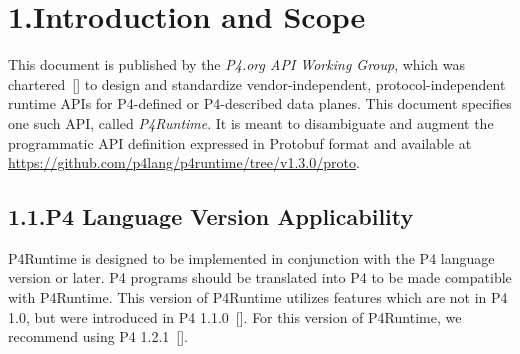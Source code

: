 \documentclass[11pt]{article}
\begin{document}
{\begin{mdtoc}
\begin{mdtocblock}

\end{mdtocblock}%
\end{mdtoc}%

\section{1.\hspace*{0.5em}Introduction and Scope}\label{sec-introduction-and-scope}%

\noindent{}This document is published by the \emph{P4.org API Working Group}, which was
chartered~[] to design and standardize vendor-independent,
protocol-independent runtime APIs for P4-defined or P4-described data
planes. This document specifies one such API, called \emph{P4Runtime}. It is meant to
disambiguate and augment the programmatic API definition expressed in Protobuf
format and available at
\href{https://github.com/p4lang/p4runtime/tree/v1.3.0/proto}{https://github.com/p4lang/p4runtime/tree/v1.3.0/proto}.%

\subsection{1.1.\hspace*{0.5em}P4 Language Version Applicability}\label{sec-p4-language-version-applicability}%

\noindent{}P4Runtime is designed to be implemented in conjunction with the P4 language
version or later. P4 programs should be translated into P4 to be made
compatible with P4Runtime. This version of P4Runtime utilizes features which are
not in P4 1.0, but were introduced in P4 1.1.0~[]. For
this version of P4Runtime, we recommend using P4 1.2.1~[].%

}
\end{document}
